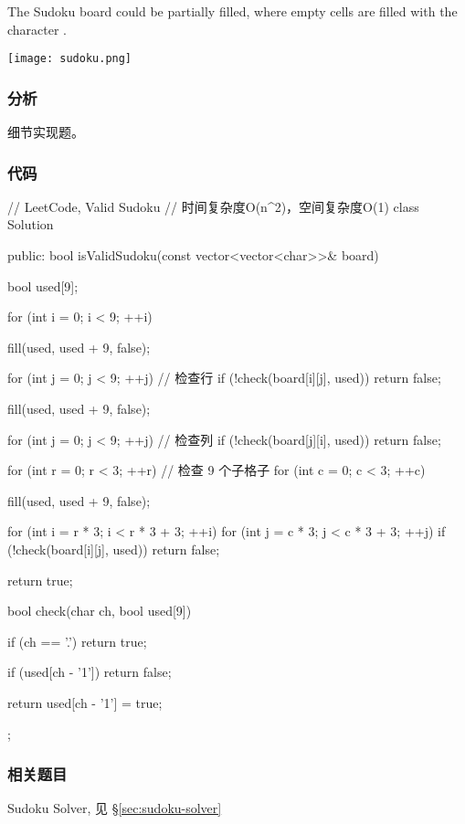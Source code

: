 The Sudoku board could be partially filled, where empty cells are filled with 
the character .

\begin{center}
	\texttt{[image: sudoku.png]}\\
	\label{fig:sudoku}
\end{center}

\subsubsection{分析}
细节实现题。


\subsubsection{代码}
\begin{Code}
	// LeetCode, Valid Sudoku
	// 时间复杂度O(n^2)，空间复杂度O(1)
	class Solution {
		public:
		bool isValidSudoku(const vector<vector<char>>& board) {
			bool used[9];
			
			for (int i = 0; i < 9; ++i) {
				fill(used, used + 9, false);
				
				for (int j = 0; j < 9; ++j) // 检查行
				if (!check(board[i][j], used))
				return false;
				
				fill(used, used + 9, false);
				
				for (int j = 0; j < 9; ++j) // 检查列
				if (!check(board[j][i], used))
				return false;
			}
			
			for (int r = 0; r < 3; ++r) // 检查 9 个子格子
			for (int c = 0; c < 3; ++c) {
				fill(used, used + 9, false);
				
				for (int i = r * 3; i < r * 3 + 3; ++i)
				for (int j = c * 3; j < c * 3 + 3; ++j)
				if (!check(board[i][j], used))
				return false;
			}
			
			return true;
		}
		
		bool check(char ch, bool used[9]) {
			if (ch == '.') return true;
			
			if (used[ch - '1']) return false;
			
			return used[ch - '1'] = true;
		}
	};
\end{Code}


\subsubsection{相关题目}
\begindot
\item Sudoku Solver, 见 \S \ref{sec:sudoku-solver}
\myenddot


